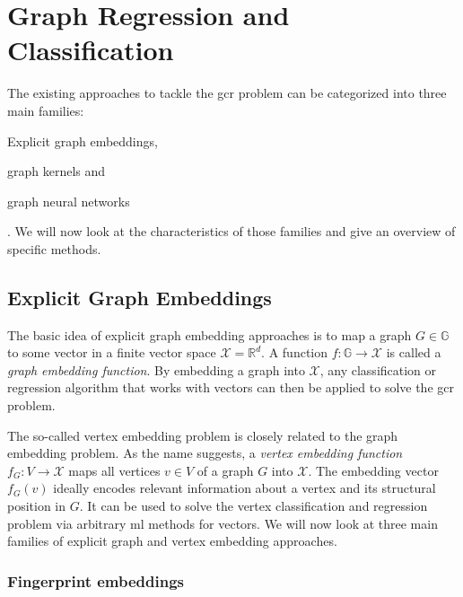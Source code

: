 \section{Graph Regression and Classification}%
\label{sec:related:gcr}

The existing approaches to tackle the \ac{gcr} problem can be categorized into three main families:
\begin{enumerate*}
	\item Explicit graph embeddings,
	\item graph kernels and
	\item graph neural networks
\end{enumerate*}.
We will now look at the characteristics of those families and give an overview of specific methods.

\subsection{Explicit Graph Embeddings}%
\label{sec:related:gcr:embed}

The basic idea of explicit graph embedding approaches is to map a graph $G \in \mathbb{G}$ to some vector in a finite vector space $\mathcal{X} = \mathbb{R}^d$.
A function $f: \mathbb{G} \to \mathcal{X}$ is called a \textit{graph embedding function}.
By embedding a graph into $\mathcal{X}$, any classification or regression algorithm that works with vectors can then be applied to solve the \ac{gcr} problem.

The so-called vertex embedding problem is closely related to the graph embedding problem.
As the name suggests, a \textit{vertex embedding function} $f_G: V \to \mathcal{X}$ maps all vertices $v \in V$ of a graph $G$ into $\mathcal{X}$.
The embedding vector $f_G(v)$ ideally encodes relevant information about a vertex and its structural position in $G$.
It can be used to solve the vertex classification and regression problem via arbitrary \ac{ml} methods for vectors.
We will now look at three main families of explicit graph and vertex embedding approaches.

\subsubsection{Fingerprint embeddings}

